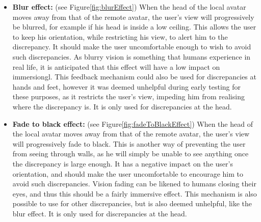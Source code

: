 \begin{itemize}
    
    \item \textbf{Blur effect:} (see Figure\autoref{fig:blurEffect})
    \newline
    When the head of the local avatar moves away from that of the remote avatar, the user's view will progressively be blurred, for example if his head is inside a low ceiling. This allows the user to keep his orientation, while restricting his view, to alert him to the discrepancy. It should make the user uncomfortable enough to wish to avoid such discrepancies. As blurry vision is something that humans experience in real life, it is anticipated that this effect will have a low impact on \gls{immersiongl}.
    \newline
    This feedback mechanism could also be used for discrepancies at hands and feet, however it was deemed unhelpful during early testing for these purposes, as it restricts the user's view, impeding him from realising where the discrepancy is. It is only used for discrepancies at the head.
    
    \item \textbf{Fade to black effect:} (see Figure\autoref{fig:fadeToBlackEffect})
    \newline
    When the head of the local avatar moves away from that of the remote avatar, the user’s view will progressively fade to black. This is another way of preventing the user from seeing through walls, as he will simply be unable to see anything once the discrepancy is large enough. It has a negative impact on the user's orientation, and should make the user uncomfortable to encourage him to avoid such discrepancies. Vision fading can be likened to humans closing their eyes, and thus this should be a fairly immersive effect.
    \newline
    This mechanism is also possible to use for other discrepancies, but is also deemed unhelpful, like the blur effect. It is only used for discrepancies at the head.
    

\end{itemize}
